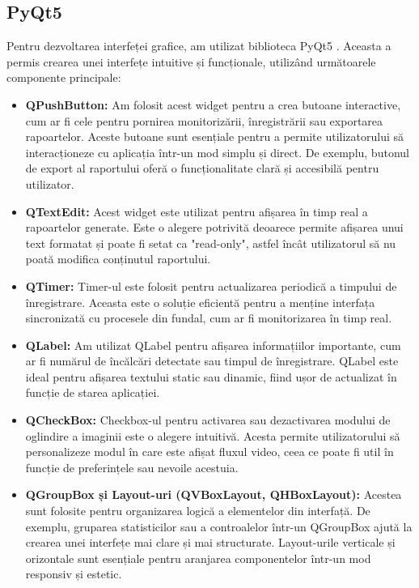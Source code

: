 \documentclass[12pt,a4paper]{article}
\begin{document}
\subsection{PyQt5}
Pentru dezvoltarea interfeței grafice, am utilizat biblioteca PyQt5 \cite{pyqt5}. Aceasta a permis crearea unei interfețe intuitive și funcționale, utilizând următoarele componente principale:

\begin{itemize}
    \item \textbf{QPushButton:} Am folosit acest widget pentru a crea butoane interactive, cum ar fi cele pentru pornirea monitorizării, înregistrării sau exportarea rapoartelor. Aceste butoane sunt esențiale pentru a permite utilizatorului să interacționeze cu aplicația într-un mod simplu și direct. De exemplu, butonul de export al raportului oferă o funcționalitate clară și accesibilă pentru utilizator.

    \item \textbf{QTextEdit:} Acest widget este utilizat pentru afișarea în timp real a rapoartelor generate. Este o alegere potrivită deoarece permite afișarea unui text formatat și poate fi setat ca "read-only", astfel încât utilizatorul să nu poată modifica conținutul raportului.

    \item \textbf{QTimer:} Timer-ul este folosit pentru actualizarea periodică a timpului de înregistrare. Aceasta este o soluție eficientă pentru a menține interfața sincronizată cu procesele din fundal, cum ar fi monitorizarea în timp real.

    \item \textbf{QLabel:} Am utilizat QLabel pentru afișarea informațiilor importante, cum ar fi numărul de încălcări detectate sau timpul de înregistrare. QLabel este ideal pentru afișarea textului static sau dinamic, fiind ușor de actualizat în funcție de starea aplicației.

    \item \textbf{QCheckBox:} Checkbox-ul pentru activarea sau dezactivarea modului de oglindire a imaginii este o alegere intuitivă. Acesta permite utilizatorului să personalizeze modul în care este afișat fluxul video, ceea ce poate fi util în funcție de preferințele sau nevoile acestuia.

    \item \textbf{QGroupBox și Layout-uri (QVBoxLayout, QHBoxLayout):} Acestea sunt folosite pentru organizarea logică a elementelor din interfață. De exemplu, gruparea statisticilor sau a controalelor într-un QGroupBox ajută la crearea unei interfețe mai clare și mai structurate. Layout-urile verticale și orizontale sunt esențiale pentru aranjarea componentelor într-un mod responsiv și estetic.


\end{itemize}
\end{document}
